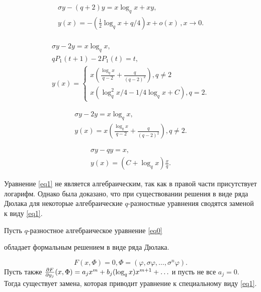 \documentclass[a4paper, 14pt]{extarticle}
\begin{document}
\begin{example}
\begin{gather*}
\sigma y - (q+2) y = x \log_q x + x y,\\ 
y(x) = -\left(\frac{1}{2}\log_q x + q/4\right)x + o(x)\,, x\to 0.\\
\end{gather*}
\end{example}

\begin{example}
    \begin{gather*}
    \sigma y - 2 y = x\log_q x,\\
    q P_1(t+1) - 2P_1(t) = t,\\
    y(x) = \begin{cases}
        x\left(\frac{\log_q x}{q-2} + \frac{q}{(q-2)^2}  \right), q\neq 2 \\
        x \left( \log^2_q x/4 - 1/4 \log_q x + C \right), q = 2.
    \end{cases} 
    \end{gather*}
\end{example}



\begin{example}
    \begin{gather*}
    \sigma y - 2 y = x\log_q x,\\
    y(x) = x\left(\frac{\log_q x}{q-2} + \frac{q}{(q-2)^2}  \right), q\neq 2.
    \end{gather*}
\end{example}

 \begin{example}
    \begin{gather*}
    \sigma y - q y = x,\\
    y(x) = (C + \log_q x)\frac{x}{q}.
    \end{gather*}
\end{example}

Уравнение \eqref{eq1} не является алгебраическим, так как в правой части присутствует логарифм.
Однако была доказано, что при существовании решения в виде ряда Дюлака для некоторые алгебраические $q$-разностные уравнения сводятся заменой к виду \eqref{eq1}.

\begin{theorem}
    Пусть $q$-разностное алгебраическое уравнение
       \eqref{eq0} 

        обладает формальным решением в виде ряда Дюлака.
        
    $$F(x, \Phi) = 0,
        \Phi = (\varphi, \sigma \varphi, \ldots, \sigma^n \varphi).
       $$
        Пусть также
        $
        \frac{\partial F}{\partial y_j}(x,\Phi) = a_j x^m + b_j(\log_q x)x^{m+1} + \ldots \notag
        $
    и пусть не все $a_j=0$. Тогда существует замена, которая приводит уравнение к специальному виду \eqref{eq1}.
    \end{theorem}
\end{document}

